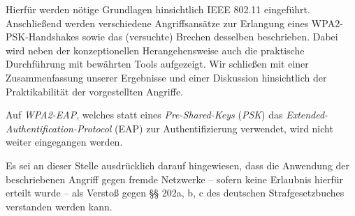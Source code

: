 Hierfür werden nötige Grundlagen hinsichtlich IEEE 802.11 eingeführt.
Anschließend werden verschiedene Angriffsansätze zur Erlangung eines WPA2-PSK-Handshakes sowie das (versuchte) Brechen desselben beschrieben. 
Dabei wird neben der konzeptionellen Herangehensweise auch die praktische Durchführung mit bewährten Tools aufgezeigt. 
Wir schließen mit einer Zusammenfassung unserer Ergebnisse und einer Diskussion hinsichtlich der Praktikabilität der vorgestellten Angriffe.

Auf \textit{WPA2-EAP}, welches statt eines \textit{Pre-Shared-Keys} (\textit{PSK}) das \textit{Extended-Authentification-Protocol} (EAP) zur Authentifizierung verwendet, wird nicht weiter eingegangen werden.

Es sei an dieser Stelle ausdrücklich darauf hingewiesen, dass die Anwendung der beschriebenen Angriff gegen fremde Netzwerke -- sofern keine Erlaubnis hierfür erteilt wurde -- als Verstoß gegen §§ 202a, b, c des deutschen Strafgesetzbuches verstanden werden kann.
